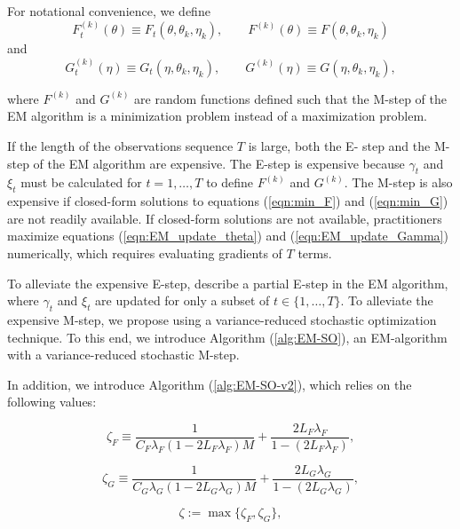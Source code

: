For notational convenience, we define
\begin{equation}
    F_t^{(k)}(\theta) \equiv F_t(\theta,\theta_k,\eta_k), \qquad F^{(k)}(\theta) \equiv F(\theta,\theta_k,\eta_k)
    \label{eqn:Fk}
\end{equation}
and
\begin{equation}
    G_t^{(k)}(\eta) \equiv G_t(\eta,\theta_k,\eta_k), \qquad G^{(k)}(\eta) \equiv G(\eta,\theta_k,\eta_k),
    \label{eqn:Gk}
\end{equation}

where $F^{(k)}$ and $G^{(k)}$ are random functions defined such that the M-step of the EM algorithm is a minimization problem instead of a maximization problem. 

If the length of the observations sequence $T$ is large, %
both the E- step and the M- step of the EM algorithm are expensive. The E-step is expensive because $\gamma_t$ and $\xi_t$ must be calculated for $t = 1,\ldots,T$ to define $F^{(k)}$ and $G^{(k)}$. The M-step is also expensive if closed-form solutions to equations (\ref{eqn:min_F}) and (\ref{eqn:min_G}) are not readily available. If closed-form solutions are not available, practitioners maximize equations (\ref{eqn:EM_update_theta}) and (\ref{eqn:EM_update_Gamma}) numerically, which requires evaluating gradients of $T$ terms.

To alleviate the expensive E-step, \citet{Neal:1998} describe a partial E-step in the EM algorithm, where $\gamma_t$ and $\xi_t$ are updated for only a subset of $t \in \{1,\ldots,T\}$. To alleviate the expensive M-step, we propose using a variance-reduced stochastic optimization technique. To this end, we introduce Algorithm (\ref{alg:EM-SO}), an EM-algorithm with a variance-reduced stochastic M-step. 

In addition, we introduce Algorithm (\ref{alg:EM-SO-v2}), which relies on the following values:

$$\zeta_F \equiv \frac{1}{C_F \lambda_F(1-2L_F\lambda_F)M} + \frac{2L_F\lambda_F}{1-(2L_F\lambda_F)},$$ 

$$\zeta_G \equiv \frac{1}{C_G \lambda_G(1-2L_G\lambda_G)M} + \frac{2L_G\lambda_G}{1-(2L_G\lambda_G)},$$

$$\zeta := \max\{\zeta_F,\zeta_G\},$$

